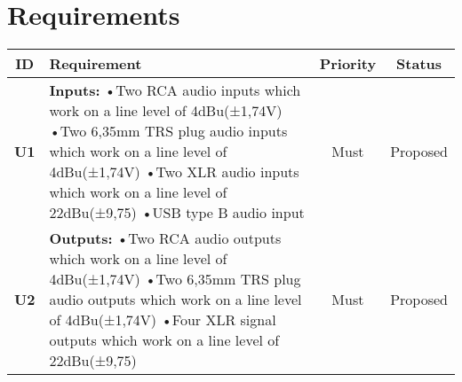 
	\newpage
	\section{Requirements}
	\begin{longtable}{|c|p{10cm}|c|c|}
		\hline
		\textbf{ID} & \textbf{Requirement} & \textbf{Priority} & \textbf{Status}\\ \hline 
		\textbf{U1} & \textbf{Inputs:} \newline
		•Two RCA audio inputs which work on a line level of 4dBu(±1,74V)\newline
		•Two 6,35mm TRS plug audio inputs which work on a line level of 4dBu(±1,74V)\newline
		•Two XLR audio inputs which work on a line level of 22dBu(±9,75)\newline
		•USB type B audio input & Must & Proposed\\ \hline

		\textbf{U2} & \textbf{Outputs:} \newline
		•Two RCA audio outputs which work on a line level of 4dBu(±1,74V)\newline
		•Two 6,35mm TRS plug audio outputs which work on a line level of 4dBu(±1,74V)\newline
		•Four XLR signal outputs which work on a line level of 22dBu(±9,75)
		 & Must & Proposed\\ \hline


\end{longtable}

